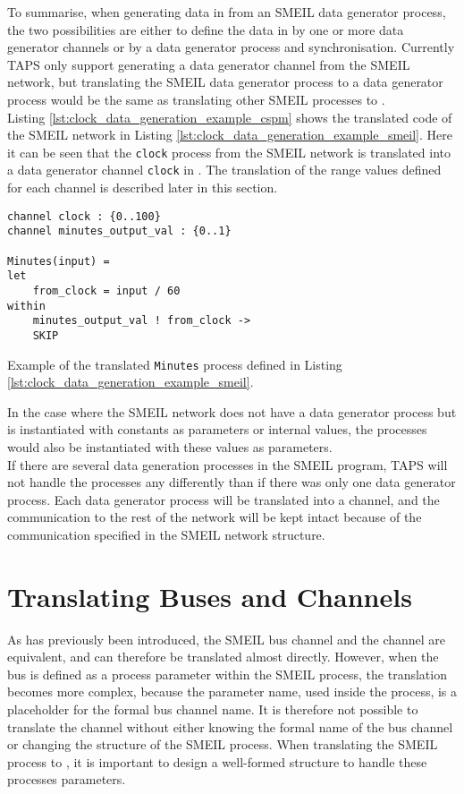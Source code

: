 To summarise, when generating data in \cspm{} from an SMEIL data generator process, the two possibilities are either to define the data in \cspm{} by one or more data generator channels or by a data generator process and synchronisation.
Currently TAPS only support generating a data generator channel from the SMEIL network, but translating the SMEIL data generator process to a \cspm{} data generator process would be the same as translating other SMEIL processes to \cspm{}.\\

Listing \ref{lst:clock_data_generation_example_cspm} shows the translated code of the SMEIL network in Listing \ref{lst:clock_data_generation_example_smeil}. Here it can be seen that the \texttt{clock} process from the SMEIL network is translated into a data generator channel \texttt{clock} in \cspm{}. The translation of the range values defined for each channel is described later in this section.
\begin{listing}
\begin{verbatim}
channel clock : {0..100}
channel minutes_output_val : {0..1}

Minutes(input) =
let
    from_clock = input / 60
within
    minutes_output_val ! from_clock ->
    SKIP

\end{verbatim}
\caption{Example of the translated \texttt{Minutes} process defined in Listing \ref{lst:clock_data_generation_example_smeil}.}
\label{lst:clock_data_generation_example_cspm}
\end{listing}
In the case where the SMEIL network does not have a data generator process but is instantiated with constants as parameters or internal values, the \cspm{} processes would also be instantiated with these values as parameters.\\

If there are several data generation processes in the SMEIL program, TAPS will not handle the processes any differently than if there was only one data generator process. Each data generator process will be translated into a \cspm{} channel, and the communication to the rest of the network will be kept intact because of the communication specified in the SMEIL network structure.

\section{Translating Buses and Channels}
As has previously been introduced, the SMEIL bus channel and the \cspm{} channel are equivalent, and can therefore be translated almost directly. However, when the bus is defined as a process parameter within the SMEIL process, the translation becomes more complex, because the parameter name, used inside the process, is a placeholder for the formal bus channel name. It is therefore not possible to translate the channel without either knowing the formal name of the bus channel or changing the structure of the SMEIL process.
When translating the SMEIL process to \cspm{}, it is important to design a well-formed structure to handle these processes parameters.\\

